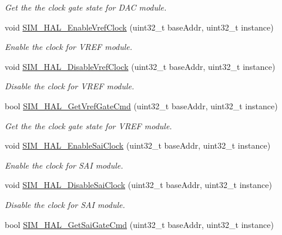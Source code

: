 \begin{DoxyCompactItemize}
\begin{DoxyCompactList}\small\item\em Get the the clock gate state for D\+AC module. \end{DoxyCompactList}\item 
void \hyperlink{group__sim__hal_ga50439fde9249a4d15e8abc03b22cc3ed}{S\+I\+M\+\_\+\+H\+A\+L\+\_\+\+Enable\+Vref\+Clock} (uint32\+\_\+t base\+Addr, uint32\+\_\+t instance)
\begin{DoxyCompactList}\small\item\em Enable the clock for V\+R\+EF module. \end{DoxyCompactList}\item 
void \hyperlink{group__sim__hal_ga03dbf349e86d711d695bd3bfe00fe742}{S\+I\+M\+\_\+\+H\+A\+L\+\_\+\+Disable\+Vref\+Clock} (uint32\+\_\+t base\+Addr, uint32\+\_\+t instance)
\begin{DoxyCompactList}\small\item\em Disable the clock for V\+R\+EF module. \end{DoxyCompactList}\item 
bool \hyperlink{group__sim__hal_ga0d33eae129883f62480573e606621871}{S\+I\+M\+\_\+\+H\+A\+L\+\_\+\+Get\+Vref\+Gate\+Cmd} (uint32\+\_\+t base\+Addr, uint32\+\_\+t instance)
\begin{DoxyCompactList}\small\item\em Get the the clock gate state for V\+R\+EF module. \end{DoxyCompactList}\item 
void \hyperlink{group__sim__hal_ga83a9d3c41978faa0f2e9827931269897}{S\+I\+M\+\_\+\+H\+A\+L\+\_\+\+Enable\+Sai\+Clock} (uint32\+\_\+t base\+Addr, uint32\+\_\+t instance)
\begin{DoxyCompactList}\small\item\em Enable the clock for S\+AI module. \end{DoxyCompactList}\item 
void \hyperlink{group__sim__hal_gac9ee10248dcddf5dfde4219db35ca596}{S\+I\+M\+\_\+\+H\+A\+L\+\_\+\+Disable\+Sai\+Clock} (uint32\+\_\+t base\+Addr, uint32\+\_\+t instance)
\begin{DoxyCompactList}\small\item\em Disable the clock for S\+AI module. \end{DoxyCompactList}\item 
bool \hyperlink{group__sim__hal_ga71508d6f5ed10add5d560b12c7013390}{S\+I\+M\+\_\+\+H\+A\+L\+\_\+\+Get\+Sai\+Gate\+Cmd} (uint32\+\_\+t base\+Addr, uint32\+\_\+t instance)

\end{DoxyCompactItemize}
